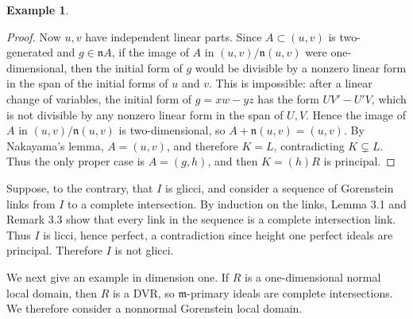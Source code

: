 \documentclass[11pt,letterpaper]{amsart}
\theoremstyle{plain}
\theoremstyle{definition}
\newtheorem{ex}[thm]{Example}
\theoremstyle{remark}
\begin{document}
\begin{ex}
\begin{proof}
Now $u,v$ have independent linear parts. Since $A\subset (u,v)$ is two-generated and $g\in \mathfrak n A$, if the image of $A$ in $(u,v)/\mathfrak n(u,v)$ were one-dimensional, then the initial form of $g$ would be divisible by a nonzero linear form in the span of the initial forms of $u$ and $v$. This is impossible: after a linear change of variables, the initial form of $g=xw-yz$ has the form $UV'-U'V$, which is not divisible by any nonzero linear form in the span of $U,V$. Hence the image of $A$ in $(u,v)/\mathfrak n(u,v)$ is two-dimensional, so $A+\mathfrak n(u,v)=(u,v)$. By Nakayama's lemma, $A=(u,v)$, and therefore $K=L$, contradicting $K\subsetneq L$. Thus the only proper case is $A=(g,h)$, and then $K=(h)R$ is principal.
\end{proof}

Suppose, to the contrary, that \(I\) is glicci, and consider a sequence of Gorenstein links from \(I\) to a complete intersection. By induction on the links, Lemma 3.1 and Remark 3.3 show that every link in the sequence is a complete intersection link. Thus \(I\) is licci, hence perfect, a contradiction since height one perfect ideals are principal. Therefore \(I\) is not glicci.
\end{ex}
We next give an example in dimension one. If \(R\) is a one-dimensional normal local domain, then \(R\) is a DVR, so $\mathfrak m$-primary ideals are complete intersections. We therefore consider a nonnormal Gorenstein local domain.
\end{document}
